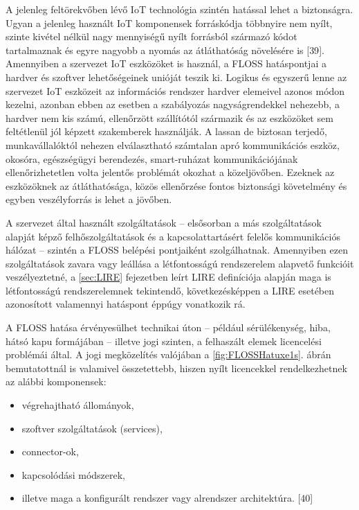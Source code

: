 \documentclass[12pt,magyar,a4paper,oneside]{scrreprt}
\providecommand{\tightlist}{%
  \setlength{\itemsep}{0pt}\setlength{\parskip}{0pt}}
\begin{document}
A jelenleg feltörekvőben lévő IoT technológia szintén hatással lehet a
biztonságra. Ugyan a jelenleg használt IoT komponensek forráskódja
többnyire nem nyílt, szinte kivétel nélkül nagy mennyiségű nyílt
forrásból származó kódot tartalmaznak és egyre nagyobb a nyomás az
átláthatóság növelésére is {[}39{]}. Amennyiben a szervezet IoT
eszközöket is használ, a FLOSS hatáspontjai a hardver és szoftver
lehetőségeinek unióját teszik ki. Logikus és egyszerű lenne az szervezet
IoT eszközeit az információs rendszer hardver elemeivel azonos módon
kezelni, azonban ebben az esetben a szabályozás nagyságrendekkel
nehezebb, a hardver nem kis számú, ellenőrzött szállítótól származik és
az eszközöket sem feltétlenül jól képzett szakemberek használják. A
lassan de biztosan terjedő, munkavállalóktól nehezen elválasztható
számtalan apró kommunikációs eszköz, okosóra, egészségügyi berendezés,
smart-ruházat kommunikációjának ellenőrizhetetlen volta jelentős
problémát okozhat a közeljövőben. Ezeknek az eszközöknek az
átláthatósága, közös ellenőrzése fontos biztonsági követelmény és egyben
veszélyforrás is lehet a jövőben.

A szervezet által használt szolgáltatások -- elsősorban a más
szolgáltatások alapját képző felhőszolgáltatások és a kapcsolattartásért
felelős kommunikációs hálózat -- szintén a FLOSS belépési pontjaiként
szolgálhatnak. Amennyiben ezen szolgáltatások zavara vagy leállása a
létfontosságú rendszerelem alapvető funkcióit veszélyeztetné, a
\ref{sec:LIRE} fejezetben leírt LIRE definíciója alapján maga is
létfontosságú rendszerelemnek tekintendő, következésképpen a LIRE
esetében azonosított valamennyi hatáspont éppúgy vonatkozik rá.

A FLOSS hatása érvényesülhet technikai úton -- például sérülékenység,
hiba, hátsó kapu formájában -- illetve jogi szinten, a felhaszált elemek
licencelési problémái által. A jogi megközelítés valójában a
\ref{fig:FLOSSHatuxe1s}. ábrán bemutatottnál is valamivel összetettebb,
hiszen nyílt licencekkel rendelkezhetnek az alábbi komponensek:

\begin{itemize}
\tightlist
\item
  végrehajtható állományok,
\item
  szoftver szolgáltatások (services),
\item
  connector-ok,
\item
  kapcsolódási módszerek,
\item
  illetve maga a konfigurált rendszer vagy alrendszer architektúra.
  {[}40{]}
\end{itemize}
\end{document}
